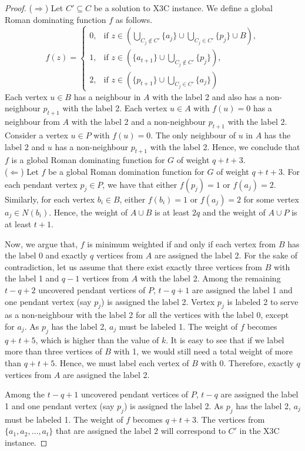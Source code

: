 \documentclass[preprint,12pt]{elsarticle}
\begin{document}
\begin{proof}
    ($\Rightarrow$) Let $C'\subseteq C$ be a solution to X3C instance. We define a global Roman dominating function $f$ as follows.
    \[
f(z) = 
\begin{cases}
0, & \text{if } z \in \left(\bigcup\limits_{C_j \notin C'} \{a_j\} \cup \bigcup\limits_{C_j \in C'} \{p_j\} \cup B\right), \\
1, & \text{if } z \in \left(\{a_{t+1}\} \cup \bigcup\limits_{C_j \notin C'} \{p_j\}\right), \\
2, & \text{if } z \in \left(\{p_{t+1}\} \cup \bigcup\limits_{C_j \in C'} \{a_j\}\right)
\end{cases}
\]
Each vertex $u \in B$ has a neighbour in $A$ with the label 2 and also has a non-neighbour $p_{t+1}$ with the label 2. Each vertex $u \in A$ with $f(u)= 0 $ has a neighbour from $A$ with the label 2 and a non-neighbour $p_{t+1}$ with the label 2. Consider a vertex $u \in P$ with $f(u) = 0$. The only neighbour of $u$ in $A$ has the label 2 and $u$ has a non-neighbour $p_{t+1}$ with the label 2. Hence, we conclude that $f$ is a global Roman dominating function for $G$ of weight $q+t+3$. \vspace{2mm} \\
    ($\Leftarrow$) Let $f$ be a global Roman domination function for $G$ of weight $q+t+3$. For each pendant vertex $p_j \in P$, we have that either $f(p_j) = 1$ or $f(a_j) = 2$. Similarly, for each vertex $b_i \in B$, either $f(b_i) = 1$ or $f(a_j) = 2$ for some vertex $a_j \in N(b_i)$. Hence, the weight of $A \cup B$ is at least $2q$ and the weight of $A \cup P$ is at least $t+1$. 
    
    Now, we argue that, $f$ is minimum weighted if and only if each vertex from $B$ has the label 0 and exactly $q$ vertices from $A$ are assigned the label 2. For the sake of contradiction, let us assume that there exist exactly three vertices from $B$ with the label 1 and $q-1$ vertices from $A$ with the label 2. Among the remaining $t-q+2$ uncovered pendant vertices of $P$, $t-q+1$ are assigned the label 1 and one pendant vertex (say $p_j$) is assigned the label 2. Vertex $p_j$ is labeled 2 to serve as a non-neighbour with the label 2 for all the vertices with the label 0, except for $a_j$. As $p_j$ has the label 2, $a_j$ must be labeled 1. The weight of $f$ becomes $q+t+5$, which is higher than the value of $k$. It is easy to see that if we label more than three vertices of $B$ with 1, we would still need a total weight of more than $q+t+5$. Hence, we must label each vertex of $B$ with 0. Therefore, exactly $q$ vertices from $A$ are assigned the label 2. 
    
    Among the $t-q+1$ uncovered pendant vertices of $P$, $t-q$ are assigned the label 1 and one pendant vertex (say $p_j$) is assigned the label 2. As $p_j$ has the label 2, $a_j$ must be labeled 1. The weight of $f$ becomes $q+t+3$. The vertices from $\{a_1, a_{2}, \ldots, a_t\}$ that are assigned the label 2 will correspond to $C'$ in the X3C instance. 
\end{proof}
\end{document}
